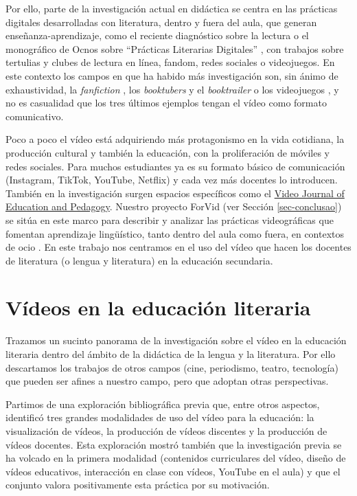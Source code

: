 \documentclass[spanish]{textolivre}
\begin{document}
Por ello, parte de la investigación actual en didáctica se centra en las prácticas digitales desarrolladas con literatura, dentro y fuera del aula, que generan enseñanza-aprendizaje, como el reciente diagnóstico sobre la lectura \cite{cruces_villalobos_como_2017} o el monográfico de Ocnos sobre “Prácticas Literarias Digitales” \cite{cassany_editorial:_2021}, con trabajos sobre tertulias y clubes de lectura en línea, fandom, redes sociales o videojuegos. En este contexto los campos en que ha habido más investigación son, sin ánimo de exhaustividad, la \textit{fanfiction} \cite{black_adolescents_2008}, los \textit{booktubers} \cite{rovira-collado_booktrailer_2017} y el \textit{booktrailer} \cite{tabernero_sala_book_2013} o los videojuegos \cite{ramada_prieto_esto_2017}, y no es casualidad que los tres últimos ejemplos tengan el vídeo como formato comunicativo.

Poco a poco el vídeo está adquiriendo más protagonismo en la vida cotidiana, la producción cultural y también la educación, con la proliferación de móviles y redes sociales. Para muchos estudiantes ya es su formato básico de comunicación (Instagram, TikTok, YouTube, Netflix) y cada vez más docentes lo introducen. También en la investigación surgen espacios específicos como el \hyperlink{https://brill.com/view/journals/vjep/vjep-overview.xml}{Video Journal of Education and Pedagogy}. Nuestro proyecto ForVid (ver Sección \ref{sec-conclusao}) se sitúa en este marco para describir y analizar las prácticas videográficas que fomentan aprendizaje lingüístico, tanto dentro del aula \cite{cassany_editorial:_2021} como fuera, en contextos de ocio \cite{cassany_daniel_coord._fandom_2019}. En este trabajo nos centramos en el uso del vídeo que hacen los docentes de literatura (o lengua y literatura) en la educación secundaria.

\section{Vídeos en la educación literaria}\label{sec-normas}
Trazamos un sucinto panorama de la investigación sobre el vídeo en la educación literaria dentro del ámbito de la didáctica de la lengua y la literatura. Por ello descartamos los trabajos de otros campos (cine, periodismo, teatro, tecnología) que pueden ser afines a nuestro campo, pero que adoptan otras perspectivas.

Partimos de una exploración bibliográfica previa \cite{cassany_ya_2021} que, entre otros aspectos, identificó tres grandes modalidades de uso del vídeo para la educación: la visualización de vídeos, la producción de vídeos discentes y la producción de vídeos docentes. Esta exploración mostró también que la investigación previa se ha volcado en la primera modalidad (contenidos curriculares del vídeo, diseño de vídeos educativos, interacción en clase con vídeos, YouTube en el aula) y que el conjunto valora positivamente esta práctica por su motivación.
\end{document}
